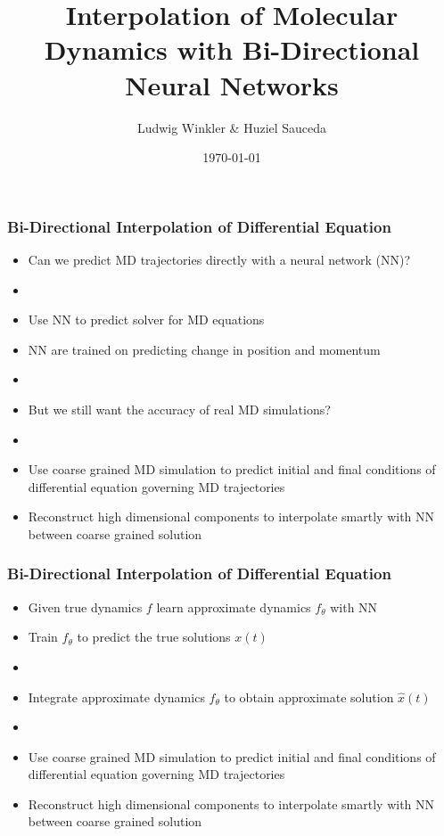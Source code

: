 \documentclass[usenames, dvipsnames, t]{beamer}
\title{Interpolation of Molecular Dynamics with Bi-Directional Neural Networks}
\subtitle{}
\author{Ludwig Winkler \& Huziel Sauceda}
\date{\today}
\begin{document}
\def\mathn#1{\mathnormal{#1}}
\def\thet{\bm{\theta}}
\def\V{\mathn{V}}
\def\Q{\mathn{Q}}
\def\R{\mathn{R}}
\def\r{\mathn{r}}
\def\G{\mathn{G}}
\def\n{\mathn{n}}
\def\A{\mathn{A}}
\def\T{\mathn{T}}
\def\W{\mathn{W}}

\def\w{\mathn{w}}
\def\p{\mathn{p}}
\def\q{\mathn{q}}
\def\a{\mathn{a}}
\def\r{\mathn{r}}
\def\s{\mathn{s}}
\def\t{\mathn{t}}
\def\dist{1}

\newcommand{\E}{\mathbb{E}}



\begin{frame}
	\titlepage
\end{frame}


\begin{frame}
	\frametitle{Bi-Directional Interpolation of Differential Equation}
	\begin{itemize}
		\item Can we predict MD trajectories directly with a neural network (NN)?
		\item[] 
		\item Use NN to predict solver for MD equations
		\item NN are trained on predicting change in position and momentum
		\item[]  
		\item But we still want the accuracy of real MD simulations?
		\item[]   
		\item Use coarse grained MD simulation to predict initial and final conditions of differential equation governing MD trajectories
		\item Reconstruct high dimensional components to interpolate smartly with NN between coarse grained solution
	\end{itemize}
\end{frame}

\begin{frame}
	\frametitle{Bi-Directional Interpolation of Differential Equation}
	\begin{itemize}
		\item Given true dynamics $f$ learn approximate dynamics $f_\theta$ with NN
		\item Train $f_\theta$ to predict the true solutions $x(t)$
		\item[] 
		\item Integrate approximate dynamics $f_\theta$ to obtain approximate solution $\hat{x}(t)$
		\item[]   
		\item Use coarse grained MD simulation to predict initial and final conditions of differential equation governing MD trajectories
		\item Reconstruct high dimensional components to interpolate smartly with NN between coarse grained solution
	\end{itemize}
\end{frame}
\end{document}

